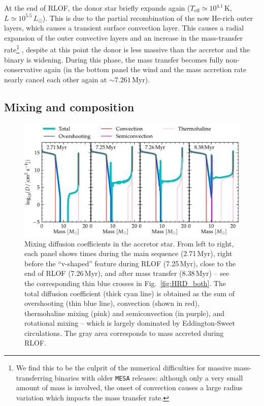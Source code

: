 \documentclass[twocolumn,twocolappendix,trackchanges]{aastex63}
\DeclareRobustCommand{\Figref}[1]{Fig.~\ref{#1}}
\begin{document}
At the end of RLOF, the donor star briefly expands again
($T_\mathrm{eff}\simeq10^{4.1}$\,K, $L\simeq10^{5.5}\,L_\odot$). This
is due to the partial recombination of the now He-rich outer layers,
which causes a transient surface convection layer. This causes a
radial expansion of the outer convective layers and an increase in the
mass-transfer rate\footnote{We find this to be the culprit of the numerical
difficulties for massive mass-transferring binaries with older
\texttt{MESA} releases: although only a very small amount of mass is
involved, the onset of convection causes a large radius variation
which impacts the mass transfer rate.}
, despite at this point the donor is less massive
than the accretor and the binary is widening.  During this phase, the
mass transfer becomes fully non-conservative again (in the bottom
panel the wind and the mass accretion rate nearly cancel each other again
at $\sim7.261$\,Myr).

\subsection{Mixing and composition}
\label{sec:mixing}

\begin{figure}[htbp]
  \includegraphics[width=\textwidth]{D_mix}
  \caption{Mixing diffusion coefficients in the accretor star. From
    left to right, each panel shows times during the main sequence
    (2.71\,Myr), right before the ``v-shaped'' feature during RLOF
    (7.25\,Myr), close to the end of RLOF (7.26\,Myr), and after mass
    transfer (8.38\,Myr) -- see the corresponding thin blue crosses in
    \Figref{fig:HRD_both}. The total diffusion coefficient (thick cyan
    line) is obtained as the sum of overshooting (thin blue line),
    convection (shown in red), thermohaline mixing (pink) and
    semiconvection (in purple), and rotational mixing -- which is
    largely dominated by Eddington-Sweet circulations. The gray area corresponds to mass
    accreted during
    RLOF.}
  \label{fig:D_mix}
\end{figure}
\end{document}
